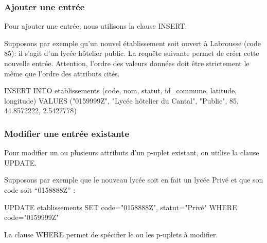 \documentclass[
  a4paper,
  DIV=11,
  numbers=noendperiod]{scrartcl}
\newenvironment{Shaded}{\begin{snugshade}}{\end{snugshade}}
\newcommand{\DecValTok}[1]{\textcolor[rgb]{0.68,0.00,0.00}{#1}}
\newcommand{\FloatTok}[1]{\textcolor[rgb]{0.68,0.00,0.00}{#1}}
\newcommand{\KeywordTok}[1]{\textcolor[rgb]{0.00,0.23,0.31}{#1}}
\newcommand{\NormalTok}[1]{\textcolor[rgb]{0.00,0.23,0.31}{#1}}
\newcommand{\OperatorTok}[1]{\textcolor[rgb]{0.37,0.37,0.37}{#1}}
\newcommand{\OtherTok}[1]{\textcolor[rgb]{0.00,0.23,0.31}{#1}}
\begin{document}
\hypertarget{ajouter-une-entruxe9e}{%
\subsubsection{Ajouter une entrée}\label{ajouter-une-entruxe9e}}

Pour ajouter une entrée, nous utilisons la clause INSERT.

Supposons par exemple qu'un nouvel établissement soit ouvert à Labrousse
(code 85): il s'agit d'un lycée hôtelier public. La requête suivante
permet de créer cette nouvelle entrée. Attention, l'ordre des valeurs
données doit être strictement le même que l'ordre des attributs cités.

\begin{Shaded}
\begin{Highlighting}[]
\KeywordTok{INSERT} \KeywordTok{INTO}\NormalTok{ etablissements}
\NormalTok{(code, nom, statut, id\_commune, latitude, longitude)}
\KeywordTok{VALUES}
\NormalTok{(}\OtherTok{"0159999Z"}\NormalTok{, }\OtherTok{"Lycée hôtelier du Cantal"}\NormalTok{, }\OtherTok{"Public"}\NormalTok{, }\DecValTok{85}\NormalTok{, }\FloatTok{44.8572222}\NormalTok{, }\FloatTok{2.5427778}\NormalTok{)}
\end{Highlighting}
\end{Shaded}

\hypertarget{modifier-une-entruxe9e-existante}{%
\subsubsection{Modifier une entrée
existante}\label{modifier-une-entruxe9e-existante}}

Pour modifier un ou plusieurs attributs d'un p-uplet existant, on
utilise la clause UPDATE.

Supposons par exemple que le nouveau lycée soit en fait un lycée Privé
et que son code soit ``0158888Z'' :

\begin{Shaded}
\begin{Highlighting}[]
\KeywordTok{UPDATE}\NormalTok{ etablissements}
\KeywordTok{SET}\NormalTok{ code}\OperatorTok{=}\OtherTok{"0158888Z"}\NormalTok{, statut}\OperatorTok{=}\OtherTok{"Privé"}
\KeywordTok{WHERE}\NormalTok{ code}\OperatorTok{=}\OtherTok{"0159999Z"}
\end{Highlighting}
\end{Shaded}

La clause WHERE permet de spécifier le ou les p-uplets à modifier.
\end{document}
